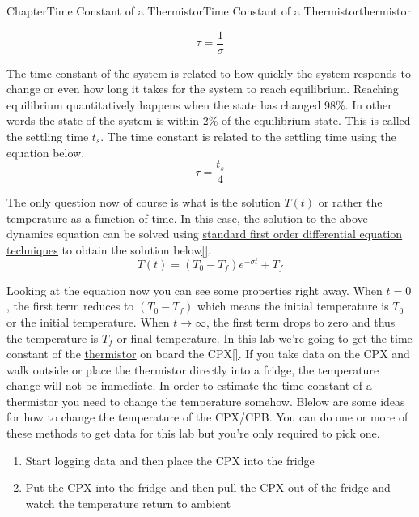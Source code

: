 \documentclass[oneside,10pt,]{book}
\newcommand{\xreffont}{\relax}
\newcommand{\linkhilite}[1]{\underline{#1}}
\numberwithin{equation}{section}
\begin{document}
\begin{chapterptx}{Chapter}{Time Constant of a Thermistor}{}{Time Constant of a Thermistor}{}{}{thermistor}
\begin{introduction}{}
\begin{equation}
\tau = \frac{1}{\sigma}\label{thermistor-2-4-11}
\end{equation}
%
\par
The time constant of the system is related to how quickly the system responds to change or even how long it takes for the system to reach equilibrium. Reaching equilibrium quantitatively happens when the state has changed 98\%. In other words the state of the system is within 2\% of the equilibrium state. This is called the settling time \(t_s\). The time constant is related to the settling time using the equation below.%
\begin{equation}
\tau = \frac{t_s}{4}\label{thermistor-2-5-2}
\end{equation}
%
\par
The only question now of course is what is the solution \(T(t)\) or rather the temperature as a function of time. In this case, the solution to the above dynamics equation can be solved using \href{https://www.youtube.com/watch?v=VOv2HI3i7oo}{\linkhilite{standard first order differential equation techniques}} to obtain the solution below\hyperlink{youtube}{\linkhilite{[{\xreffont 50}]}}.%
\begin{equation}
T(t) = (T_0-T_f)e^{-\sigma t} + T_f\label{e_thermistor}
\end{equation}
%
\par
Looking at the equation now you can see some properties right away. When \(t=0\), the first term reduces to \((T_0-T_f)\) which means the initial temperature is \(T_0\) or the initial temperature. When \(t\rightarrow\infty\), the first term drops to zero and thus the temperature is \(T_f\) or final temperature. In this lab we're going to get the time constant of the \href{https://en.wikipedia.org/wiki/Thermistor}{\linkhilite{thermistor}} on board the CPX\hyperlink{thermistor-wikipedia}{\linkhilite{[{\xreffont 63}]}}. If you take data on the CPX and walk outside or place the thermistor directly into a fridge, the temperature change will not be immediate. In order to estimate the time constant of a thermistor you need to change the temperature somehow. Blelow are some ideas for how to change the temperature of the CPX\slash{}CPB. You can do one or more of these methods to get data for this lab but you're only required to pick one.%
\begin{enumerate}
\item{}Start logging data and then place the CPX into the fridge%
\item{}Put the CPX into the fridge and then pull the CPX out of the fridge and watch the temperature return to ambient%

\end{enumerate}
\end{introduction}
\end{chapterptx}
\end{document}
